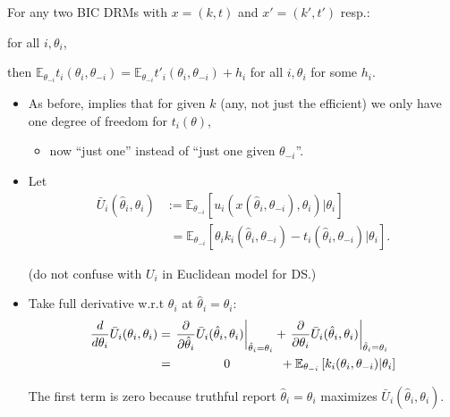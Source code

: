 \documentclass[english,handout,10pt]{beamer}		%
\def\lyxframeend{} %
\begin{document}
\begin{theorem}
	For any two BIC DRMs with $x = (k,t)$ and $x' = (k',t')$ resp.:
	 	
	 for all $i,\theta_i$,
	
	\alert{then $\mathbb{E}_{\theta_{-i}} t_i(\theta_i, \theta_{-i}) = \mathbb{E}_{\theta_{-i}} t'_i(\theta_i, \theta_{-i}) + h_i$} for all $i,\theta_i$ for some $h_i$.
\end{theorem}
\begin{itemize}
	\item As before, implies that for given $k$ (any, not just the efficient) we only have one degree of freedom for $t_i(\theta)$,
	\begin{itemize}
		\item now ``just one'' instead of ``just one given $\theta_{-i}$''.
	\end{itemize}
\end{itemize}
\lyxframeend


\begin{itemize}
	\item Let 
	\vspace{-0.5em}\begin{align*}
	\bar{U}_i (\hat{\theta}_i,\theta_i) &:= \mathbb{E}_{\theta_{-i}} \left[ u_i \left( x(\hat{\theta}_i, \theta_{-i}), \theta_i \right) | \theta_i \right]
	\\
	&\,\,= \mathbb{E}_{\theta_{-i}} \left[ \theta_i k_i(\hat{\theta}_i, \theta_{-i}) - t_i \left( \hat{\theta}_i, \theta_{-i} \right) | \theta_i \right].
	\end{align*}\vspace{-1em}
	
	(do not confuse with $U_i$ in Euclidean model for DS.)
	\pause
	\item Take full derivative w.r.t $\theta_i$ at $\hat{\theta}_i=\theta_i$:
	\vspace{-0.5em}\begin{align*}
		\frac{d}{d \theta_i} \bar{U}_i (\theta_i,\theta_i) &= \left. \frac{\partial}{\partial \hat{\theta}_i} \bar{U}_i (\hat{\theta}_i,\theta_i) \right|_{\hat{\theta}_i=\theta_i} + \left. \frac{\partial}{\partial \theta_i} \bar{U}_i (\hat{\theta}_i,\theta_i) \right|_{\hat{\theta}_i=\theta_i}
		\\ &= \hspace{1.4cm} 0 \hspace{1.4cm} + \mathbb{E}_{\theta_{-i}} \left[k_i (\theta_i, \theta_{-i}) | \theta_i \right]
	\end{align*}\vspace{-1em}
	
	The first term is zero because truthful report $\hat{\theta}_i = \theta_i$ maximizes $\bar{U}_i (\hat{\theta}_i,\theta_i)$.
\end{itemize}
\lyxframeend
\end{document}
